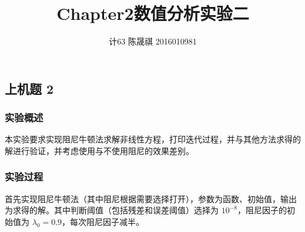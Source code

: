 \documentclass[11pt]{ctexart}
\title{Chapter2}
\begin{document}
    
	\title{数值分析实验二}
	\author{计63\,\,陈晟祺\,\,2016010981}
    
    \maketitle
    

    \subsection{上机题 2}\label{ux4e0aux673aux9898-2}

\subsubsection{实验概述}\label{ux5b9eux9a8cux6982ux8ff0}

本实验要求实现阻尼牛顿法求解非线性方程，打印迭代过程，并与其他方法求得的解进行验证，并考虑使用与不使用阻尼的效果差别。

\subsubsection{实验过程}\label{ux5b9eux9a8cux8fc7ux7a0b}

首先实现阻尼牛顿法（其中阻尼根据需要选择打开），参数为函数、初始值，输出为求得的解。其中判断阈值（包括残差和误差阈值）选择为
\(10^{-8}\)，阻尼因子的初始值为 \(\lambda_0=0.9\)，每次阻尼因子减半。
\end{document}
